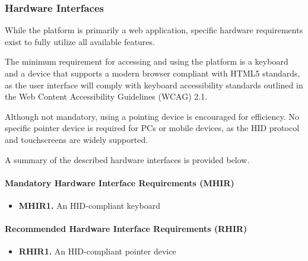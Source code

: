 \subsubsection{Hardware Interfaces}
While the platform is primarily a web application, specific hardware requirements exist to fully utilize all available features.

The minimum requirement for accessing and using the platform is a keyboard and a device that supports a modern browser compliant with HTML5 standards, as the user interface will comply with keyboard accessibility standards outlined in the Web Content Accessibility Guidelines (WCAG) 2.1.

Although not mandatory, using a pointing device is encouraged for efficiency. No specific pointer device is required for PCs or mobile devices, as the HID protocol and touchscreens are widely supported.




A summary of the described hardware interfaces is provided below.

\paragraph{Mandatory Hardware Interface Requirements (MHIR)}
\begin{itemize}
    \item \textbf{MHIR1.} An HID-compliant keyboard
\end{itemize}

\paragraph{Recommended Hardware Interface Requirements (RHIR)}
\begin{itemize}
    \item \textbf{RHIR1.} An HID-compliant pointer device
\end{itemize}

